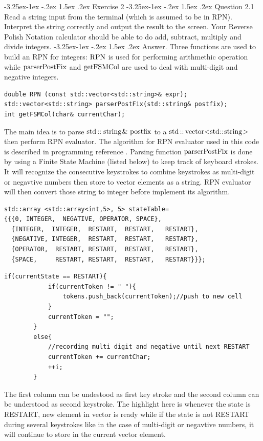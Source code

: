 \documentclass[a4paper,12pt]{article}%
\makeatletter
\renewcommand\section{\@startsection{section}{2}{\z@}%
                                     {-3.25ex\@plus -1ex \@minus -.2ex}%
                                     {1.5ex \@plus .2ex}%
                                     {\normalfont\large\bfseries}}%
\renewcommand\subsection{\@startsection{subsection}{2}{\z@}%
                                     {-3.25ex\@plus -1ex \@minus -.2ex}%
                                     {1.5ex \@plus .2ex}%
                                     {\normalfont\bfseries}}
\renewcommand\subsubsection{\@startsection{subsection}{2}{\z@}%
                                     {-3.25ex\@plus -1ex \@minus -.2ex}%
                                     {1.5ex \@plus .2ex}%
                                     {\normalfont\bfseries\itshape}}%
\makeatother
\begin{document}
\section{Exercise 2}
\subsection{Question 2.1}
Read a string input from the terminal (which is assumed to be in RPN). Interpret the string
correctly and output the result to the screen.
Your Reverse Polish Notation calculator should be able to do add, subtract, multiply and
divide integers.
\subsubsection{Answer.}
Three functions are used to build an RPN for integers: $\lstinline{RPN}$ is used for performing arithmethic operation while $\lstinline{parserPostFix}$ and $\lstinline{getFSMCol}$ are used to deal with multi-digit and negative integers.
\begin{lstlisting}
double RPN (const std::vector<std::string>& expr);
std::vector<std::string> parserPostFix(std::string& postfix);
int getFSMCol(char& currentChar);
\end{lstlisting}
The main idea is to parse $\lstinline{std::string& postfix}$ to a $\lstinline{std::vector<std::string>}$ then perform RPN evaluator. The algorithm for RPN evaluator used in this code is described in programming reference \cite[]{roberts2013}.
Parsing function $\lstinline{parserPostFix}$ is done by using a Finite State Machine (listed below) to keep track of keyboard strokes.  It will recognize the consecutive keystrokes to combine keystrokes as multi-digit or negavtive numbers then store to vector elements as a string. RPN evaluator will then convert those string to integer before implement its algorithm. 
\begin{lstlisting}
std::array <std::array<int,5>, 5> stateTable= 
{{{0, INTEGER,  NEGATIVE, OPERATOR, SPACE},
  {INTEGER,  INTEGER,  RESTART,  RESTART,   RESTART},
  {NEGATIVE, INTEGER,  RESTART,  RESTART,   RESTART},
  {OPERATOR,  RESTART, RESTART,  RESTART,   RESTART},
  {SPACE,     RESTART, RESTART,  RESTART,   RESTART}}};
\end{lstlisting}
\begin{lstlisting}
if(currentState == RESTART){
            if(currentToken != " "){
                tokens.push_back(currentToken);//push to new cell
            }
            currentToken = "";
        }
        else{
            //recording multi digit and negative until next RESTART
            currentToken += currentChar;
            ++i;
        }
\end{lstlisting}
The first column can be undestood as first key stroke and the second column can be understood as second keystroke. The highlight here is whenever the state is RESTART, new element in vector is ready while if the state is not RESTART during several keystrokes like in the case of multi-digit or negavtive numbers, it will continue to store in the current vector element.
\end{document}
